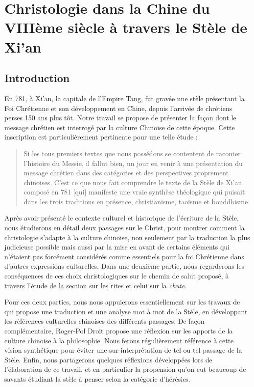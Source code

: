\chapter{Christologie dans la Chine du VIIIème siècle à travers le Stèle de Xi'an}

\label{ch:christologieChine}
\section{Introduction}

En 781, à Xi'an, la capitale de l'Empire Tang, fut gravée une stèle présentant la Foi Chrétienne et son développement en Chine, depuis l'arrivée de chrétiens perses 150 ans plus tôt. Notre travail se propose de présenter la façon dont le message chrétien est interrogé par la culture Chinoise de cette époque. Cette inscription est particulièrement pertinente pour une telle étude : 

\begin{quote}
Si les tous premiers textes que nous possédons se contentent de raconter l'histoire du Messie, il fallut bien, un jour en venir à une présentation du message chrétien dans des catégories et des perspectives proprement chinoises. C'est ce que nous fait comprendre le texte de la Stèle de Xi'an composé en 781 [qui] manifeste une vraie synthèse théologique qui puisait dans les trois traditions en présence, christianisme, taoïsme et bouddhisme. \cite[p.~150]{Raguin:JesusMessieXian} 
\end{quote}

Après avoir présenté le contexte culturel et historique de l'écriture de la Stèle, nous étudierons en détail deux passages sur le Christ, pour montrer comment la christologie s'adapte à la culture chinoise, non seulement par la traduction la plus judicieuse possible mais aussi par la mise en avant de certains éléments qui n'étaient pas forcément considérés comme essentiels pour la foi Chrétienne dans d'autres expressions culturelles.
Dans une deuxième partie, nous regarderons les conséquences de ces choix christologiques sur le chemin de salut proposé, à travers l'étude de la section sur les rites et celui sur la \textit{chute}. 

Pour ces deux parties, nous nous appuierons essentiellement sur les travaux de \cite{Havret:stelechretienne} qui propose une traduction et une analyse mot à mot de la Stèle, en développant les références culturelles chinoises des différents passages. De façon complémentaire, Roger-Pol Droit \citep{PolDroit:voyage} propose une réflexion sur les apports de la culture chinoise à la philosophie. Nous ferons régulièrement référence à cette vision synthétique pour éviter une sur-interprétation de tel ou tel passage de la Stèle. 
Enfin, nous partagerons quelques réflexions développées lors de l'élaboration de ce travail, et en particulier la propension qu'on eut beaucoup de savants étudiant la stèle à penser selon la catégorie d'hérésies.


